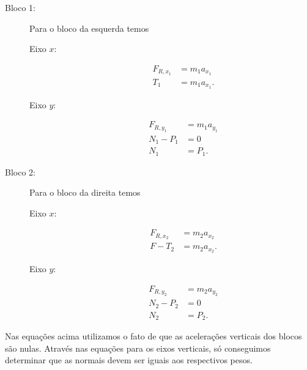 \begin{description}
    \item[Bloco 1:] Para o bloco da esquerda temos
        \begin{description}
            \item[Eixo $x$:]
                \begin{align}
                    F_{R, x_1} &= m_1 a_{x_1} \\
                    T_1 &= m_1 a_{x_1}. \label{Eq:BlocosAcelLateralX1}
                \end{align}
            \item[Eixo $y$:]
                \begin{align}
                    F_{R, y_1} &= m_1 a_{y_1} \\
                    N_1 - P_1 &= 0 \\
                    N_1 &= P_1.
                \end{align}
        \end{description}
    \item[Bloco 2:] Para o bloco da direita temos
        \begin{description}
            \item[Eixo $x$:]
                \begin{align}
                    F_{R, x_2} &= m_2 a_{x_2} \\
                    F - T_2 &= m_2 a_{x_2}. \label{Eq:BlocosAcelLateralX2}
                \end{align}
            \item[Eixo $y$:]
                \begin{align}
                    F_{R, y_2} &= m_2 a_{y_2} \\
                    N_2 - P_2 &= 0 \\
                    N_2 &= P_2.
                \end{align}
        \end{description}
\end{description}

\noindent{}Nas equações acima utilizamos o fato de que as acelerações verticais dos blocos são nulas. Através nas equações para os eixos verticais, só conseguimos determinar que as normais devem ser iguais aos respectivos pesos.

